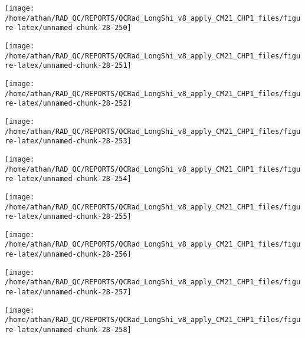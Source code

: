 \documentclass[
  10pt,
  a4paper,oneside]{article}
\begin{document}
\begin{center}\texttt{[image: /home/athan/RAD\_QC/REPORTS/QCRad\_LongShi\_v8\_apply\_CM21\_CHP1\_files/figure-latex/unnamed-chunk-28-250]} \end{center}

\begin{center}\texttt{[image: /home/athan/RAD\_QC/REPORTS/QCRad\_LongShi\_v8\_apply\_CM21\_CHP1\_files/figure-latex/unnamed-chunk-28-251]} \end{center}

\begin{center}\texttt{[image: /home/athan/RAD\_QC/REPORTS/QCRad\_LongShi\_v8\_apply\_CM21\_CHP1\_files/figure-latex/unnamed-chunk-28-252]} \end{center}

\begin{center}\texttt{[image: /home/athan/RAD\_QC/REPORTS/QCRad\_LongShi\_v8\_apply\_CM21\_CHP1\_files/figure-latex/unnamed-chunk-28-253]} \end{center}

\begin{center}\texttt{[image: /home/athan/RAD\_QC/REPORTS/QCRad\_LongShi\_v8\_apply\_CM21\_CHP1\_files/figure-latex/unnamed-chunk-28-254]} \end{center}

\begin{center}\texttt{[image: /home/athan/RAD\_QC/REPORTS/QCRad\_LongShi\_v8\_apply\_CM21\_CHP1\_files/figure-latex/unnamed-chunk-28-255]} \end{center}

\begin{center}\texttt{[image: /home/athan/RAD\_QC/REPORTS/QCRad\_LongShi\_v8\_apply\_CM21\_CHP1\_files/figure-latex/unnamed-chunk-28-256]} \end{center}

\begin{center}\texttt{[image: /home/athan/RAD\_QC/REPORTS/QCRad\_LongShi\_v8\_apply\_CM21\_CHP1\_files/figure-latex/unnamed-chunk-28-257]} \end{center}

\begin{center}\texttt{[image: /home/athan/RAD\_QC/REPORTS/QCRad\_LongShi\_v8\_apply\_CM21\_CHP1\_files/figure-latex/unnamed-chunk-28-258]} \end{center}
\end{document}
